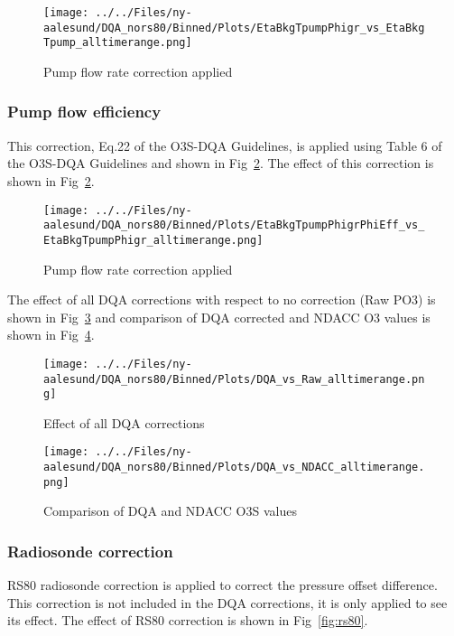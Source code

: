 \documentclass{article}
\begin{document}
%
\begin{figure}
\centering
\texttt{[image: ../../Files/ny-aalesund/DQA\_nors80/Binned/Plots/EtaBkgTpumpPhigr\_vs\_EtaBkgTpump\_alltimerange.png]}
\caption{Pump flow rate correction applied}
\label{fig:pf_ptu}
\end{figure}
\subsubsection{Pump flow efficiency}
This correction, Eq.22 of the O3S-DQA Guidelines, is applied using Table 6 of the O3S-DQA Guidelines and
shown in Fig~\ref{fig:pf_eff}.
The effect of this correction is shown in Fig~\ref{fig:pf_eff}.
%
\begin{figure}
\centering
\texttt{[image: ../../Files/ny-aalesund/DQA\_nors80/Binned/Plots/EtaBkgTpumpPhigrPhiEff\_vs\_EtaBkgTpumpPhigr\_alltimerange.png]}
\caption{Pump flow rate correction applied}
\label{fig:pf_eff}
\end{figure}

%
The effect of all DQA corrections with respect to no correction (Raw PO3) is shown in Fig~\ref{fig:dqa_all}
and comparison of DQA corrected and
NDACC O3 values is shown in Fig~\ref{fig:fig_dqa_ndacc}.

\begin{figure}
\centering
\texttt{[image: ../../Files/ny-aalesund/DQA\_nors80/Binned/Plots/DQA\_vs\_Raw\_alltimerange.png]}
\caption{Effect of all DQA corrections}
\label{fig:dqa_all}
\end{figure}
%
\begin{figure}
\centering
\texttt{[image: ../../Files/ny-aalesund/DQA\_nors80/Binned/Plots/DQA\_vs\_NDACC\_alltimerange.png]}
\caption{Comparison of DQA and NDACC O3S values}
\label{fig:fig_dqa_ndacc}
\end{figure}
 \subsubsection{Radiosonde correction}
RS80 radiosonde correction is applied to correct the pressure offset difference.
This correction is not included in the DQA corrections, it is only applied to see its effect.
The effect of RS80 correction is shown in Fig~\ref{fig:rs80}. \\
\end{document}
